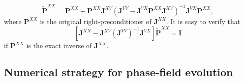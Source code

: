 \documentclass{article}
\begin{document}
\begin{equation}
  \widetilde{\mathbf P}^{XX} = \mathbf P^{XX} + \mathbf P^{XX}\mathbf J^{XV}\left(\mathbf J^{VV} - \mathbf J^{VX}\mathbf P^{XX}\mathbf J^{XV}\right)^{-1}\mathbf J^{VX}\mathbf P^{XX},
\end{equation}
where $\mathbf P^{XX}$ is the original right-preconditioner of $\mathbf J^{XX}$. It is easy to verify that 
\[
  \left[\mathbf J^{XX} - \mathbf J^{XV}\left(\mathbf J^{VV}\right)^{-1}\mathbf J^{VX}\right]\widetilde{\mathbf P}^{XX} = \mathbf I
\]
if $\mathbf P^{XX}$ is the exact inverse of $\mathbf J^{XX}$.


\subsection{Numerical strategy for phase-field evolution}\label{sect:cpdi}
\end{document}
